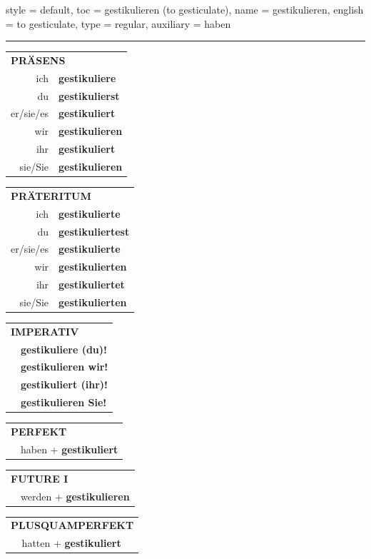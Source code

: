 \begin{verbentry}{
  style = {default},
  toc = {gestikulieren (to gesticulate)},
  name = {gestikulieren},
  english = {to gesticulate},
  type = {regular},
  auxiliary = {haben}
}


\vspace{5pt}
\hrule
\vspace{5pt}

\begin{tabular}{rl}
\multicolumn{2}{l}{\textbf{PRÄSENS}}\\
ich & \textbf{gestikuliere}\\
du & \textbf{gestikulierst}\\
er/sie/es & \textbf{gestikuliert}\\
wir & \textbf{gestikulieren}\\
ihr & \textbf{gestikuliert}\\
sie/Sie & \textbf{gestikulieren}\\
\end{tabular}
\hfill
\begin{tabular}{rl}
\multicolumn{2}{l}{\textbf{PRÄTERITUM}}\\
ich & \textbf{gestikulierte}\\
du & \textbf{gestikuliertest}\\
er/sie/es & \textbf{gestikulierte}\\
wir & \textbf{gestikulierten}\\
ihr & \textbf{gestikuliertet}\\
sie/Sie & \textbf{gestikulierten}\\
\end{tabular}
\hfill
\begin{tabular}{rl}
\multicolumn{2}{l}{\textbf{IMPERATIV}}\\
& \textbf{gestikuliere (du)!}\\
& \textbf{gestikulieren wir!}\\
& \textbf{gestikuliert (ihr)!}\\
& \textbf{gestikulieren Sie!}\\
\end{tabular}

\vspace{10pt}

\begin{tabular}{rl}
\multicolumn{2}{l}{\textbf{PERFEKT}}\\
& haben + \textbf{gestikuliert}\\
\end{tabular}
\hfill
\begin{tabular}{rl}
\multicolumn{2}{l}{\textbf{FUTURE I}}\\
& werden + \textbf{gestikulieren}\\
\end{tabular}
\hfill
\begin{tabular}{rl}
\multicolumn{2}{l}{\textbf{PLUSQUAMPERFEKT}}\\
& hatten + \textbf{gestikuliert}\\
\end{tabular}


\end{verbentry}
